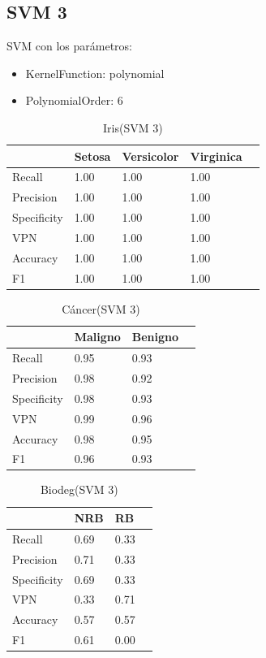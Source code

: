 \documentclass[a4paper,openwrite,12pt]{article}
\begin{document}
\subsection{SVM 3}
SVM con los parámetros:
\begin{itemize}
    \item KernelFunction: polynomial
    \item PolynomialOrder: 6
\end{itemize}

\begin{table}[H]
\centering
\begin{tabular}{@{}lllll@{}}
\toprule
            & Setosa & Versicolor & Virginica &  \\ \midrule
Recall      & 1.00   & 1.00       & 1.00      &  \\
Precision   & 1.00   & 1.00       & 1.00      &  \\
Specificity & 1.00   & 1.00       & 1.00      &  \\
VPN         & 1.00   & 1.00       & 1.00      &  \\
Accuracy    & 1.00   & 1.00       & 1.00      &  \\
F1          & 1.00   & 1.00       & 1.00      &  \\ \bottomrule
\end{tabular}
\caption{Iris(SVM 3)}
\end{table}


\begin{table}[H]
\centering
\begin{tabular}{@{}llll@{}}
\toprule
            & Maligno & Benigno &  \\ \midrule
Recall      & 0.95    & 0.93    &  \\
Precision   & 0.98    & 0.92    &  \\
Specificity & 0.98    & 0.93    &  \\
VPN         & 0.99    & 0.96    &  \\
Accuracy    & 0.98    & 0.95    &  \\
F1          & 0.96    & 0.93    &  \\ \bottomrule
\end{tabular}
\caption{Cáncer(SVM 3)}
\end{table}

\begin{table}[H]
\centering
\begin{tabular}{@{}llll@{}}
\toprule
            & NRB &   RB &  \\ \midrule
Recall      & 0.69    & 0.33    &  \\
Precision   & 0.71    & 0.33    &  \\
Specificity & 0.69    & 0.33    &  \\
VPN         & 0.33    & 0.71    &  \\
Accuracy    & 0.57    & 0.57    &  \\
F1          & 0.61    & 0.00    &  \\ \bottomrule
\end{tabular}
\caption{Biodeg(SVM 3)}
\end{table}
\end{document}

